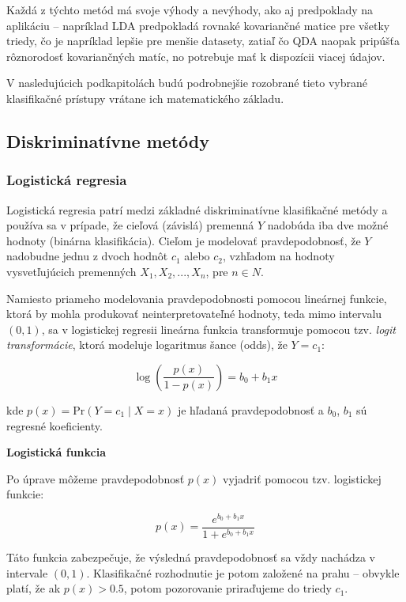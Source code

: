 Každá z týchto metód má svoje výhody a nevýhody, ako aj predpoklady na aplikáciu – napríklad LDA predpokladá rovnaké kovariančné matice pre všetky triedy, čo je napríklad lepšie pre menšie datasety, zatiaľ čo QDA naopak pripúšťa rôznorodosť kovariančných matíc, no potrebuje mať k dispozícii viacej údajov.

V nasledujúcich podkapitolách budú podrobnejšie rozobrané tieto vybrané klasifikačné prístupy vrátane ich matematického základu.

\subsection{Diskriminatívne metódy}
\label{subsec:disc_methods}

\subsubsection{Logistická regresia}
\label{subsubsec:log_regression}

Logistická regresia patrí medzi základné diskriminatívne klasifikačné metódy a používa sa v prípade, že cieľová (závislá) premenná $Y$ nadobúda iba dve možné hodnoty (binárna klasifikácia). Cieľom je modelovať pravdepodobnosť, že $Y$ nadobudne jednu z dvoch hodnôt $c_1$ alebo $c_2$, vzhľadom na hodnoty vysvetľujúcich premenných $X_1, X_2, ..., X_n$, pre $n \in N$.

Namiesto priameho modelovania pravdepodobnosti pomocou lineárnej funkcie, ktorá by mohla produkovať neinterpretovateľné hodnoty, teda mimo intervalu $(0,1)$, sa v logistickej regresii lineárna funkcia transformuje pomocou tzv. \textit{logit transformácie}, ktorá modeluje logaritmus šance (odds), že $Y = c_1$:

\begin{equation}
\log\left( \frac{p(x)}{1 - p(x)} \right) = b_0 + b_1 x
\end{equation}

kde $p(x) = \mathrm{Pr}(Y=c_1\mid X=x)$ je hľadaná pravdepodobnosť a $b_0$, $b_1$ sú regresné koeficienty.

\textbf{Logistická funkcia}

Po úprave môžeme pravdepodobnosť $p(x)$ vyjadriť pomocou tzv. logistickej funkcie:

\begin{equation}
p(x) = \frac{e^{b_0 + b_1 x}}{1 + e^{b_0 + b_1 x}}
\end{equation}

Táto funkcia zabezpečuje, že výsledná pravdepodobnosť sa vždy nachádza v intervale $(0,1)$. Klasifikačné rozhodnutie je potom založené na prahu – obvykle platí, že ak $p(x) > 0.5$, potom pozorovanie priraďujeme do triedy $c_1$.

